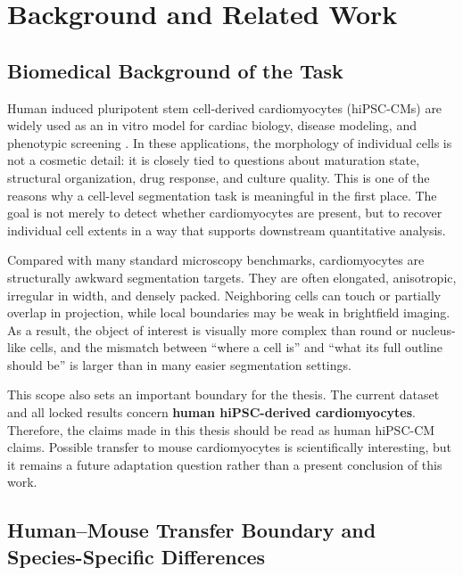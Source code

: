 \section{Background and Related Work}\label{background-and-related-work}

\subsection{Biomedical Background of the Task}\label{biomedical-background-of-the-task}

Human induced pluripotent stem cell-derived cardiomyocytes (hiPSC-CMs) are widely used as an in vitro model for cardiac biology, disease modeling, and phenotypic screening \cite{ahmed2020hipscm_maturation}. In these applications, the morphology of individual cells is not a cosmetic detail: it is closely tied to questions about maturation state, structural organization, drug response, and culture quality. This is one of the reasons why a cell-level segmentation task is meaningful in the first place. The goal is not merely to detect whether cardiomyocytes are present, but to recover individual cell extents in a way that supports downstream quantitative analysis.

Compared with many standard microscopy benchmarks, cardiomyocytes are structurally awkward segmentation targets. They are often elongated, anisotropic, irregular in width, and densely packed. Neighboring cells can touch or partially overlap in projection, while local boundaries may be weak in brightfield imaging. As a result, the object of interest is visually more complex than round or nucleus-like cells, and the mismatch between ``where a cell is'' and ``what its full outline should be'' is larger than in many easier segmentation settings.

This scope also sets an important boundary for the thesis. The current dataset and all locked results concern \textbf{human hiPSC-derived cardiomyocytes}. Therefore, the claims made in this thesis should be read as human hiPSC-CM claims. Possible transfer to mouse cardiomyocytes is scientifically interesting, but it remains a future adaptation question rather than a present conclusion of this work.

\subsection{Human--Mouse Transfer Boundary and Species-Specific Differences}\label{human-mouse-transfer-boundary-and-species-specific-differences}

